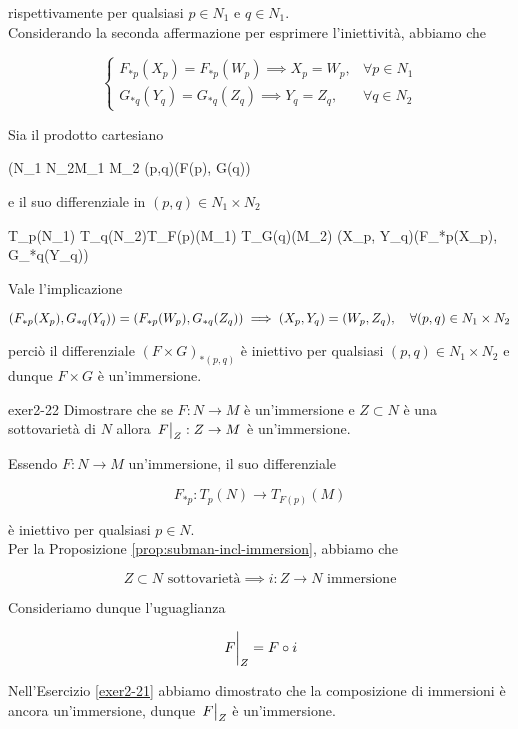 {rispettivamente per qualsiasi $ p \in N_{1} $ e $ q \in N_{1} $. \\
Considerando la seconda affermazione per esprimere l'iniettività, abbiamo che

\begin{equation}
	\begin{cases}
		F_{*p}(X_{p}) = F_{*p}(W_{p}) \implies X_{p} = W_{p}, & \forall p \in N_{1} \\
		G_{*q}(Y_{q}) = G_{*q}(Z_{q}) \implies Y_{q} = Z_{q}, & \forall q \in N_{2}
	\end{cases}
\end{equation}

Sia il prodotto cartesiano

	{(N_{1} \times N_{2}}{M_{1} \times M_{2}}
	{(p,q)}{(F(p), G(q))}

e il suo differenziale in $ (p,q) \in N_{1} \times N_{2} $

	{T_{p}(N_{1}) \times T_{q}(N_{2})}{T_{F(p)}(M_{1}) \times T_{G(q)}(M_{2})}
	{(X_{p}, Y_{q})}{(F_{*p}(X_{p}), G_{*q}(Y_{q}))}

Vale l'implicazione

\begin{equation}
	(F_{*p}(X_{p}), G_{*q}(Y_{q})) = (F_{*p}(W_{p}), G_{*q}(Z_{q})) %
	\implies %
	(X_{p}, Y_{q}) = (W_{p}, Z_{q}) %
	\qcomma \forall (p,q) \in N_{1} \times N_{2}
\end{equation}

perciò il differenziale $ (F \times G)_{*(p,q)} $ è iniettivo per qualsiasi $ (p,q) \in N_{1} \times N_{2} $ e dunque $ F \times G $ è un'immersione.
}


{exer2-22}
{
Dimostrare che se $ F : N \to M $ è un'immersione e $ Z \subset N $ è una sottovarietà di $ N $ allora $ \eval{F}_{Z} : Z \to M $ è un'immersione.
}
{
Essendo $ F : N \to M $ un'immersione, il suo differenziale

\begin{equation}
	F_{*p} : T_{p}(N) \to T_{F(p)}(M)
\end{equation}

è iniettivo per qualsiasi $ p \in N $. \\
Per la Proposizione \ref{prop:subman-incl-immersion}, abbiamo che

\begin{equation}
	Z \subset N \text{ sottovarietà} %
	\implies %
	i : Z \to N \text{ immersione}
\end{equation}

Consideriamo dunque l'uguaglianza

\begin{equation}
	\eval{F}_{Z} = F \circ i
\end{equation}

Nell'Esercizio \ref{exer2-21} abbiamo dimostrato che la composizione di immersioni è ancora un'immersione, dunque $ \eval{F}_{Z} $ è un'immersione.
}

